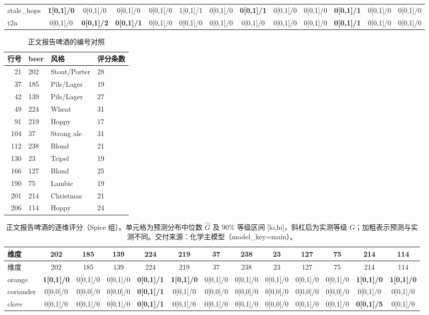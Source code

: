 \begin{landscape}
\begin{longtable}{lcccccccccccc}
stale\_hops & \textbf{1[0,1]/0} & 0[0,1]/0 & 0[0,1]/0 & 0[0,1]/0 & 1[0,1]/1 & 0[0,1]/0 & \textbf{0[0,1]/1} & 0[0,1]/0 & 0[0,1]/0 & \textbf{0[0,1]/1} & 0[0,1]/0 & 0[0,1]/0 \\
t2n & 0[0,1]/0 & \textbf{0[0,1]/2} & \textbf{0[0,1]/1} & 0[0,1]/0 & 0[0,1]/0 & 0[0,1]/0 & 0[0,1]/0 & 0[0,1]/0 & 0[0,1]/0 & \textbf{0[0,1]/1} & 0[0,1]/0 & 0[0,1]/0 \\
\end{longtable}
\end{landscape}

\begin{landscape}
\scriptsize
\begin{table}[h]
\centering
\caption{正文报告啤酒的编号对照}\label{tab:q1_report_beers_map_spice}
\begin{tabular}{rlll}
\toprule
行号 & beer & 风格 & 评分条数 \\
\midrule
21 & 202 & Stout/Porter & 28 \\
37 & 185 & Pils/Lager & 19 \\
42 & 139 & Pils/Lager & 27 \\
49 & 224 & Wheat & 31 \\
91 & 219 & Hoppy & 17 \\
104 & 37 & Strong ale & 31 \\
112 & 238 & Blond & 21 \\
130 & 23 & Tripel & 19 \\
166 & 127 & Blond & 25 \\
190 & 75 & Lambic & 19 \\
201 & 214 & Christmas & 21 \\
206 & 114 & Hoppy & 24 \\
\bottomrule
\end{tabular}
\end{table}
\begin{longtable}{lcccccccccccc}
\caption{正文报告啤酒的逐维评分（Spice 组）。单元格为预测分布中位数 $\hat G$ 及 90\% 等级区间 [lo,hi]，斜杠后为实测等级 $G$；加粗表示预测与实测不同。交付来源：化学主模型（model\_key=main）。}\label{tab:q1_report_beers_spice}\\
\toprule
维度 & 202 & 185 & 139 & 224 & 219 & 37 & 238 & 23 & 127 & 75 & 214 & 114 \\
\midrule
\endfirsthead
\toprule
维度 & 202 & 185 & 139 & 224 & 219 & 37 & 238 & 23 & 127 & 75 & 214 & 114 \\
\midrule
\endhead
\bottomrule
\endfoot
orange & \textbf{1[0,1]/0} & 0[0,1]/0 & 0[0,1]/0 & \textbf{0[0,1]/1} & \textbf{1[0,1]/0} & 0[0,1]/0 & 0[0,1]/0 & 0[0,1]/0 & 0[0,1]/0 & 0[0,1]/0 & \textbf{1[0,1]/0} & \textbf{1[0,1]/0} \\
coriander & 0[0,0]/0 & 0[0,0]/0 & 0[0,0]/0 & \textbf{0[0,1]/1} & 0[0,1]/0 & 0[0,0]/0 & 0[0,0]/0 & 0[0,0]/0 & 0[0,0]/0 & 0[0,0]/0 & 0[0,1]/0 & 0[0,1]/0 \\
clove & 0[0,1]/0 & 0[0,1]/0 & 0[0,1]/0 & \textbf{0[0,1]/1} & 0[0,1]/0 & 0[0,1]/0 & 0[0,1]/0 & 0[0,0]/0 & 0[0,1]/0 & 0[0,1]/0 & \textbf{0[0,1]/5} & 0[0,1]/0 \\
\end{longtable}
\end{landscape}

